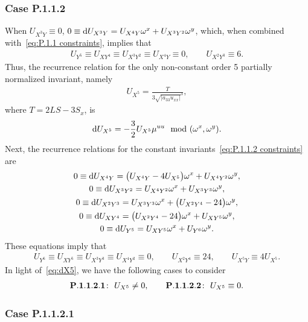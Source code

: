 \documentclass[10pt,a4paper]{amsart}
\numberwithin{equation}{section}
\begin{document}
\subsubsection{Case P.1.1.2}

When $U_{X^3Y}\equiv 0$, $0\equiv {\rm d}U_{X^3Y} = U_{X^4Y}\omega^x + U_{X^3Y^2}\omega^y$, which, when combined with~\eqref{eq:P.1.1 constraints}, implies that
\begin{gather}\label{eq:P.1.1.2 constraints}
U_{Y^5}\equiv U_{XY^4}\equiv U_{X^3Y^2} \equiv U_{X^4Y}\equiv 0,\qquad U_{X^2Y^3}\equiv 6.
\end{gather}
%
Thus, the recurrence relation for the only non-constant order 5 partially normalized invariant, namely
\begin{gather*}
U_{X^5} = \frac{T}{3\sqrt{|a_{33}u_{xx}|}^3},
\end{gather*}
where $T=2LS-3S_x$, is
%
\begin{gather}\label{eq:dX5}
{\rm d}U_{X^5} =-\frac{3}{2}U_{X^5}\mu^{uu} \mod(\omega^x,\omega^y).
\end{gather}
%
Next, the recurrence relations for the constant invariants~\eqref{eq:P.1.1.2 constraints} are
%
\begin{gather*}
0 \equiv {\rm d}U_{X^4Y} = \big(U_{X^4Y}-4U_{X^5}\big)\omega^x+U_{X^4Y^2}\omega^y,\\
0 \equiv {\rm d}U_{X^3Y^2} = U_{X^4Y^2}\omega^x+U_{X^3Y^3}\omega^y,\\
0 \equiv {\rm d}U_{X^2Y^3} = U_{X^3Y^3}\omega^x+\big(U_{X^2Y^4}-24\big)\omega^y,\\
0 \equiv {\rm d}U_{XY^4} = \big(U_{X^2Y^4}-24\big)\omega^x+U_{XY^5}\omega^y,\\
0 \equiv {\rm d}U_{Y^5} = U_{XY^5}\omega^x + U_{Y^6}\omega^y.
\end{gather*}
%
These equations imply that
%
\begin{gather}\label{eq:P.1.1.2 order 6 constraints}
U_{Y^6}\equiv U_{XY^5}\equiv U_{X^3Y^3}\equiv U_{X^4Y^2}\equiv 0,\qquad U_{X^2Y^4}\equiv 24,\qquad U_{X^5Y}\equiv 4U_{X^5}.
\end{gather}
%
In light of~\eqref{eq:dX5}, we have the following cases to consider
\begin{gather*}
{\bf P.1.1.2.1}\colon\ U_{X^5}\neq 0,\qquad
{\bf P.1.1.2.2}\colon\ U_{X^5}\equiv 0.
\end{gather*}

\subsubsection{Case P.1.1.2.1}
\end{document}
